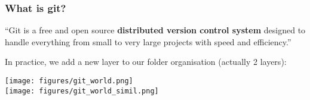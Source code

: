 \documentclass[xcolor=dvipsnames,10pt]{beamer}
\begin{document}
\begin{frame}
 \frametitle{What is git?}
 
 \begin{minipage}{1.0\textwidth}
  ``Git is a free and open source \textbf{distributed version control system} designed to handle everything from small to very large projects with speed and efficiency.''
 \end{minipage}
 \vspace*{0.4cm}
 
 In practice, we add a new layer to our folder organisation (actually 2 layers):
 
 \begin{center}
 \texttt{[image: figures/git\_world.png]}\\
 \texttt{[image: figures/git\_world\_simil.png]}  
 \end{center}
 
\end{frame}
\end{document}
